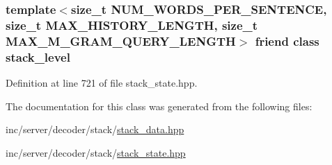 \subsubsection[{stack\+\_\+level}]{\setlength{\rightskip}{0pt plus 5cm}template$<$size\+\_\+t N\+U\+M\+\_\+\+W\+O\+R\+D\+S\+\_\+\+P\+E\+R\+\_\+\+S\+E\+N\+T\+E\+N\+C\+E, size\+\_\+t M\+A\+X\+\_\+\+H\+I\+S\+T\+O\+R\+Y\+\_\+\+L\+E\+N\+G\+T\+H, size\+\_\+t M\+A\+X\+\_\+\+M\+\_\+\+G\+R\+A\+M\+\_\+\+Q\+U\+E\+R\+Y\+\_\+\+L\+E\+N\+G\+T\+H$>$ friend class {\bf stack\+\_\+level}\hspace{0.3cm}{\ttfamily [friend]}}\label{classuva_1_1smt_1_1bpbd_1_1server_1_1decoder_1_1stack_1_1stack__state__templ_a136ccb532f42529ee8ceb4180b313f85}


Definition at line 721 of file stack\+\_\+state.\+hpp.



The documentation for this class was generated from the following files\+:\begin{DoxyCompactItemize}
\item 
inc/server/decoder/stack/\hyperlink{stack__data_8hpp}{stack\+\_\+data.\+hpp}\item 
inc/server/decoder/stack/\hyperlink{stack__state_8hpp}{stack\+\_\+state.\+hpp}\end{DoxyCompactItemize}
